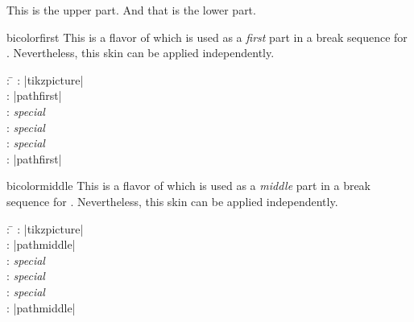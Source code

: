 \begin{dispExample}
\begin{tcolorbox}[bicolor,
  frame style={preaction={fill=blue!50!black},
    pattern=checkerboard,pattern color=blue!50!gray},
  fonttitle=\bfseries,
  colback=blue!10, colbacklower=white, opacitybacklower=0.65,
  title={Example for a semilucent lower part}]
This is the upper part.
\tcblower
And that is the lower part.
\end{tcolorbox}
\end{dispExample}

\clearpage

\begin{docSkin}{bicolorfirst}
This is a flavor of  which is used as a \emph{first} part
in a break sequence for .
Nevertheless, this skin can be applied independently.
\begin{tcolorbox}[skintable=bicolorfirst]
  \begin{tabbing}
    : \=\kill
    :  \> |tikzpicture|\\ 
    :           \> |pathfirst|\\
    : \> \emph{special}\\ 
    :        \> \emph{special}\\
    :    \> \emph{special}\\
    :           \> |pathfirst|
  \end{tabbing}
\end{tcolorbox}
\end{docSkin}

\begin{dispExample}
\end{dispExample}


\clearpage

\begin{docSkin}{bicolormiddle}
This is a flavor of  which is used as a \emph{middle} part
in a break sequence for .
Nevertheless, this skin can be applied independently.
\begin{tcolorbox}[skintable=bicolormiddle]
  \begin{tabbing}
    : \=\kill
    :  \> |tikzpicture|\\ 
    :           \> |pathmiddle|\\
    : \> \emph{special}\\ 
    :        \> \emph{special}\\
    :    \> \emph{special}\\
    :           \> |pathmiddle|
  \end{tabbing}
\end{tcolorbox}
\end{docSkin}


